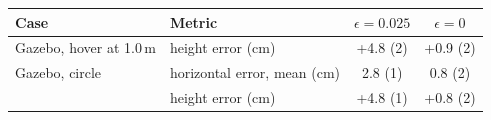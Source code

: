 \begin{tabular}{llcc}
\toprule
Case & Metric & $\epsilon = 0.025$ & $\epsilon = 0$ \\
\midrule
Gazebo, hover at 1.0\,m & height error (cm) & +4.8 (2) & +0.9 (2) \\
Gazebo, circle & horizontal error, mean (cm) & 2.8 (1) & 0.8 (2) \\
 & height error (cm) & +4.8 (1) & +0.8 (2) \\
\bottomrule
\end{tabular}
